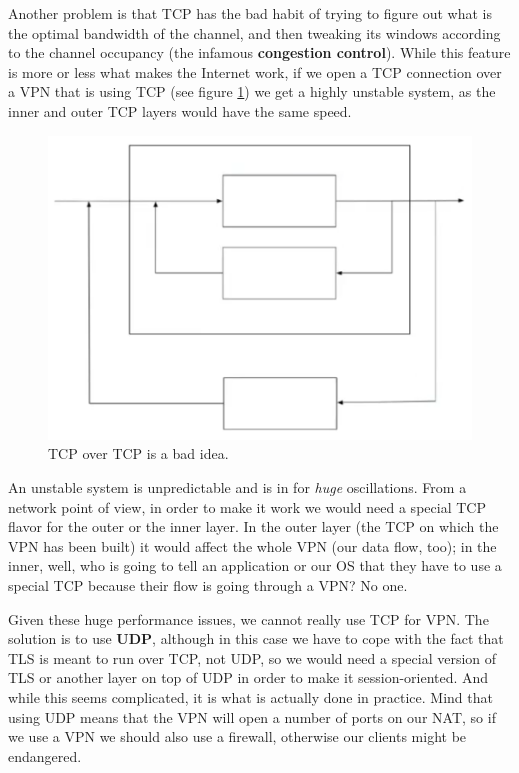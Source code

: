 Another problem is that TCP has the bad habit of trying to figure out what is the optimal bandwidth of the channel, and then tweaking its windows according to the channel occupancy (the infamous \textbf{congestion control}). While this feature is more or less what makes the Internet work, if we open a TCP connection over a VPN that is using TCP (see figure \ref{fig:tcp_in_tcp}) we get a highly unstable system, as the inner and outer TCP layers would have the same speed.

\begin{figure}[h]
    \centering
    \includegraphics[scale=0.7]{img/tcp_in_tcp.png}
    \decoRule
    \caption{TCP over TCP is a bad idea.}
    \label{fig:tcp_in_tcp}
\end{figure}

An unstable system is unpredictable and is in for \textit{huge} oscillations. From a network point of view, in order to make it work we would need a special TCP flavor for the outer or the inner layer. In the outer layer (the TCP on which the VPN has been built) it would affect the whole VPN (our data flow, too); in the inner, well, who is going to tell an application or our OS that they have to use a special TCP because their flow is going through a VPN? No one.

Given these huge performance issues, we cannot really use TCP for VPN. The solution is to use \textbf{UDP}, although in this case we have to cope with the fact that TLS is meant to run over TCP, not UDP, so we would need a special version of TLS or another layer on top of UDP in order to make it session-oriented. And while this seems complicated, it is what is actually done in practice. Mind that using UDP means that the VPN will open a number of ports on our NAT, so if we use a VPN we should also use a firewall, otherwise our clients might be endangered.

